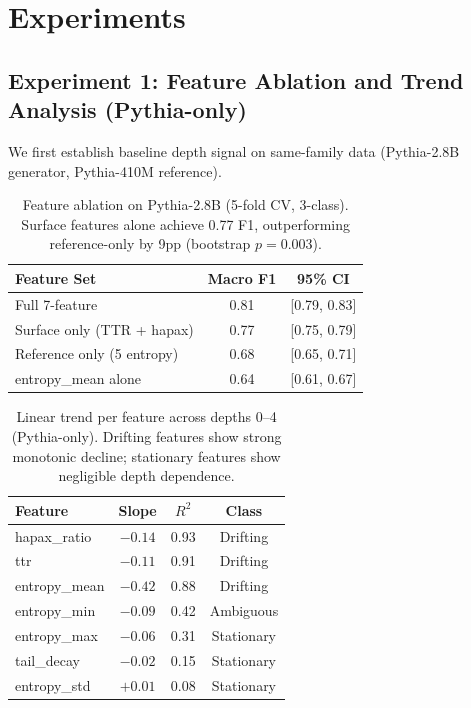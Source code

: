 \documentclass[11pt,a4paper]{article}
\begin{document}
\section{Experiments}

\subsection{Experiment 1: Feature Ablation and Trend Analysis (Pythia-only)}
\label{sec:exp1}

We first establish baseline depth signal on same-family data (Pythia-2.8B generator, Pythia-410M reference).

\begin{table}[h]
\centering
\small
\begin{tabular}{lcc}
\toprule
\textbf{Feature Set} & \textbf{Macro F1} & \textbf{95\% CI} \\
\midrule
Full 7-feature & 0.81 & [0.79, 0.83] \\
Surface only (TTR + hapax) & 0.77 & [0.75, 0.79] \\
Reference only (5 entropy) & 0.68 & [0.65, 0.71] \\
entropy\_mean alone & 0.64 & [0.61, 0.67] \\
\bottomrule
\end{tabular}
\caption{Feature ablation on Pythia-2.8B (5-fold CV, 3-class). Surface features alone achieve 0.77 F1, outperforming reference-only by 9pp (bootstrap $p=0.003$).}
\label{tab:ablation_pythia}
\end{table}

\begin{table}[h]
\centering
\small
\begin{tabular}{lccc}
\toprule
\textbf{Feature} & \textbf{Slope} & \textbf{$R^2$} & \textbf{Class} \\
\midrule
hapax\_ratio & $-0.14$ & 0.93 & Drifting \\
ttr & $-0.11$ & 0.91 & Drifting \\
entropy\_mean & $-0.42$ & 0.88 & Drifting \\
entropy\_min & $-0.09$ & 0.42 & Ambiguous \\
entropy\_max & $-0.06$ & 0.31 & Stationary \\
tail\_decay & $-0.02$ & 0.15 & Stationary \\
entropy\_std & $+0.01$ & 0.08 & Stationary \\
\bottomrule
\end{tabular}
\caption{Linear trend per feature across depths 0--4 (Pythia-only). Drifting features show strong monotonic decline; stationary features show negligible depth dependence.}
\label{tab:trend}
\end{table}
\end{document}
